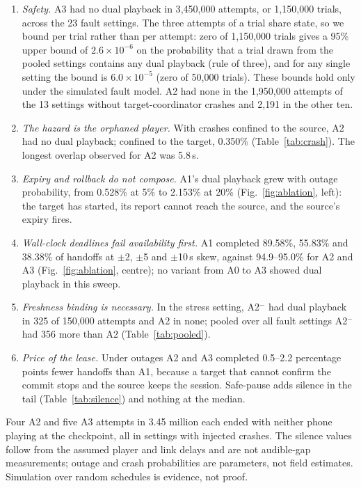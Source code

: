 \documentclass[conference]{IEEEtran}
\begin{document}
\begin{enumerate}
\item \emph{Safety.} A3 had no dual playback in 3{,}450{,}000 attempts, or 1{,}150{,}000 trials, across the 23 fault settings. The three attempts of a trial share state, so we bound per trial rather than per attempt: zero of 1{,}150{,}000 trials gives a 95\% upper bound of $2.6\times10^{-6}$ on the probability that a trial drawn from the pooled settings contains any dual playback (rule of three), and for any single setting the bound is $6.0\times10^{-5}$ (zero of 50{,}000 trials). These bounds hold only under the simulated fault model. A2 had none in the 1{,}950{,}000 attempts of the 13 settings without target-coordinator crashes and 2{,}191 in the other ten.
\item \emph{The hazard is the orphaned player.} With crashes confined to the source, A2 had no dual playback; confined to the target, 0.350\% (Table~\ref{tab:crash}). The longest overlap observed for A2 was 5.8\,s.
\item \emph{Expiry and rollback do not compose.} A1's dual playback grew with outage probability, from 0.528\% at 5\% to 2.153\% at 20\% (Fig.~\ref{fig:ablation}, left): the target has started, its report cannot reach the source, and the source's expiry fires.
\item \emph{Wall-clock deadlines fail availability first.} A1 completed 89.58\%, 55.83\% and 38.38\% of handoffs at $\pm$2, $\pm$5 and $\pm$10\,s skew, against 94.9--95.0\% for A2 and A3 (Fig.~\ref{fig:ablation}, centre); no variant from A0 to A3 showed dual playback in this sweep.
\item \emph{Freshness binding is necessary.} In the stress setting, A2$^-$ had dual playback in 325 of 150{,}000 attempts and A2 in none; pooled over all fault settings A2$^-$ had 356 more than A2 (Table~\ref{tab:pooled}).
\item \emph{Price of the lease.} Under outages A2 and A3 completed 0.5--2.2 percentage points fewer handoffs than A1, because a target that cannot confirm the commit stops and the source keeps the session. Safe-pause adds silence in the tail (Table~\ref{tab:silence}) and nothing at the median.
\end{enumerate}

Four A2 and five A3 attempts in 3.45 million each ended with neither phone playing at the checkpoint, all in settings with injected crashes. The silence values follow from the assumed player and link delays and are not audible-gap measurements; outage and crash probabilities are parameters, not field estimates. Simulation over random schedules is evidence, not proof.
\end{document}
